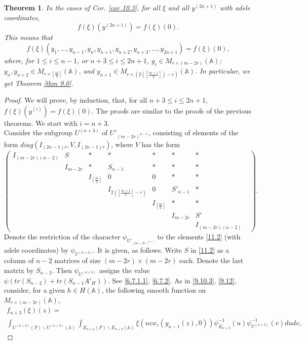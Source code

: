 \documentclass[12pts]{amsart}
\newcommand{\BA}{{\mathbb {A}}}
\newtheorem{thm}{Theorem}[section]
\begin{document}
\begin{thm}\label{thm 11.1}
In the cases of Cor. \ref{cor 10.3}, for all $\xi$ and all $y^{(2n+1)}$ with adele coordinates,
\begin{equation}\label{11.1}
f(\xi)(y^{(2n+1)})=f(\xi)(0).
\end{equation}
This means that
$$
f(\xi)(y_1,...,y_{n-1},y_n,y_{n+1},y_{n+2}, y_{n+3},...,y_{2n+1})=f(\xi)(0),
$$
where, for $1\leq i\leq n-1$, or $n+3\leq i\leq 2n+1$, $y_i\in M_{r\times (m-2r)}(\BA)$; $y_n, y_{n+2}\in M_{r\times [\frac{m}{2}]}(\BA)$, and $y_{n+1}\in M_{r\times (2([\frac{m+1}{2}])-r)}(\BA)$. In particular, we get Theorem \ref{thm 9.0}.
\end{thm}
\begin{proof}
We will prove, by induction, that, for all $n+3\leq i \leq 2n+1$, $f(\xi)(y^{(i)})=f(\xi)(0)$. The proofs are similar to the proofs of the previous theorems. We start with $i=n+3$.\\
Consider the subgroup  $U^{(n+3)}$ of $U'_{(m-2r)^{n-1}}$, consisting of elements of the form $diag(I_{(2n-1)r},V, I_{(2n-1)r})$, where $V$ has the form
\begin{equation}\label{11.2}
\begin{pmatrix}I_{(m-2r)(n-2)}&S&\ast&\ast&\ast&\ast&\ast\\
&I_{m-2r}&\ast&S_{n-1}&\ast&\ast&\ast&\\&&I_{[\frac{m}{2}]}&0&0&\ast&\ast\\&&&I_{2([\frac{m+1}{2}]-r)}&0&S'_{n-1}&\ast\\&&&&I_{[\frac{m}{2}]}&\ast&\ast\\&&&&&I_{m-2r}&S'\\&&&&&&I_{(m-2r)(n-2)}\end{pmatrix}.
\end{equation}
Denote the restriction of the character $\psi_{U'_{(m-2r)^{n-1}}}$ to the elements \eqref{11.2} (with adele coordinates) by $\psi_{U^{(n+3)}}$. It is given, as follows. Write $S$ in \eqref{11.2} as a column of $n-2$ matrices of size $(m-2r)\times (m-2r)$ each. Denote the last matrix by $S_{n-2}$. Then $\psi_{U^{(n+3)}}$ assigns the value $\psi(tr(S_{n-2})+tr(S_{n-1}A'_H))$. See \eqref{6.7.1.1}, \eqref{6.7.2}. As in \eqref{9.10.3},  \eqref{9.12}, consider, for a given $h\in H(\BA)$, the following
smooth function on $M_{r\times (m-2r)}(\BA)$,
\begin{multline}\label{11.3}
 f_{n+3}(\xi)(z)=\\
\int_{U^{(n+3)}(F)\backslash
	U^{(n+3)}(\BA)}\int_{E_{n+2}(F)\backslash E_{n+2}(\BA)}\xi(uvx_r(y_{n-1}(z),0))\psi^{-1}_{E_{n+2}}(u)\psi^{-1}_{U^{(n+3)}}(v)dudv,

\end{multline}
\end{proof}
\end{document}

